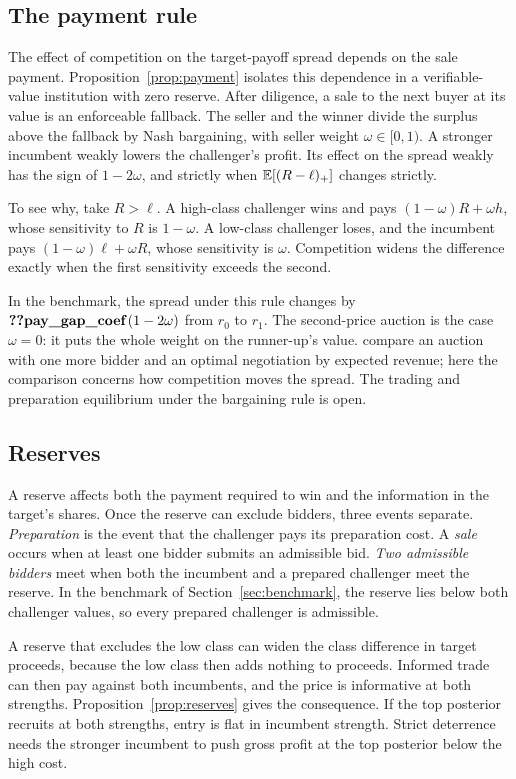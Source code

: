 \subsection{The payment rule}\label{sec:payment}

The effect of competition on the target-payoff spread depends on the sale payment. Proposition~\ref{prop:payment}
isolates this dependence in a verifiable-value institution with zero reserve. After diligence, a sale to the next
buyer at its value is an enforceable fallback. The seller and the winner divide the surplus above the fallback by Nash
bargaining, with seller weight \(\omega\in[0,1)\). A stronger incumbent weakly lowers the challenger's profit. Its
effect on the spread weakly has the sign of \(1-2\omega\), and strictly when \(\mathbb{E}[(R-\ell)_+]\) changes strictly.

To see why, take \(R>\ell\). A high-class challenger wins and pays \((1-\omega)R+\omega h\), whose sensitivity to
\(R\) is \(1-\omega\). A low-class challenger loses, and the incumbent pays \((1-\omega)\ell+\omega R\), whose
sensitivity is \(\omega\). Competition widens the difference exactly when the first sensitivity exceeds the second.

In the benchmark, the spread under this rule changes by \(\reg{pay_gap_coef}\,(1-2\omega)\) from \(r_0\) to \(r_1\).
The second-price auction is the case \(\omega=0\): it puts the whole weight on the runner-up's value.
\citet{BulowKlemperer1996} compare an auction with one more bidder and an optimal negotiation by expected revenue;
here the comparison concerns how competition moves the spread. The trading and preparation equilibrium under the
bargaining rule is open.

\subsection{Reserves}\label{sec:reserves}

A reserve affects both the payment required to win and the information in the target's shares. Once the reserve can
exclude bidders, three events separate. \emph{Preparation} is the event that the challenger pays its preparation
cost. A \emph{sale} occurs when at least one bidder submits an admissible bid. \emph{Two admissible bidders} meet
when both the incumbent and a prepared challenger meet the reserve. In the benchmark of Section~\ref{sec:benchmark},
the reserve lies below both challenger values, so every prepared challenger is admissible.

A reserve that excludes the low class can widen the class difference in target proceeds, because the low class then
adds nothing to proceeds. Informed trade can then pay against both incumbents, and the price is informative at both
strengths. Proposition~\ref{prop:reserves} gives the consequence. If the top posterior recruits at both strengths,
entry is flat in incumbent strength. Strict deterrence needs the stronger incumbent to push gross profit at the top
posterior below the high cost.

